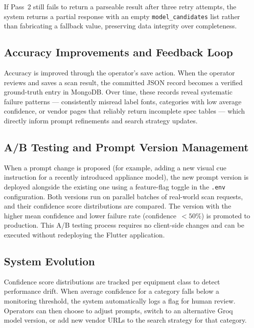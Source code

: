 If Pass~2 still fails to return a parseable result after three retry attempts, the system returns a partial response with an empty \texttt{model\_candidates} list rather than fabricating a fallback value, preserving data integrity over completeness.

\subsection{Accuracy Improvements and Feedback Loop}

Accuracy is improved through the operator's save action. When the operator reviews and saves a scan result, the committed JSON record becomes a verified ground-truth entry in MongoDB. Over time, these records reveal systematic failure patterns — consistently misread label fonts, categories with low average confidence, or vendor pages that reliably return incomplete spec tables — which directly inform prompt refinements and search strategy updates.

\subsection{A/B Testing and Prompt Version Management}

When a prompt change is proposed (for example, adding a new visual cue instruction for a recently introduced appliance model), the new prompt version is deployed alongside the existing one using a feature-flag toggle in the \texttt{.env} configuration. Both versions run on parallel batches of real-world scan requests, and their confidence score distributions are compared. The version with the higher mean confidence and lower failure rate (confidence~$< 50\%$) is promoted to production. This A/B testing process requires no client-side changes and can be executed without redeploying the Flutter application.

\subsection{System Evolution}

Confidence score distributions are tracked per equipment class to detect performance drift. When average confidence for a category falls below a monitoring threshold, the system automatically logs a flag for human review. Operators can then choose to adjust prompts, switch to an alternative Groq model version, or add new vendor URLs to the search strategy for that category.

